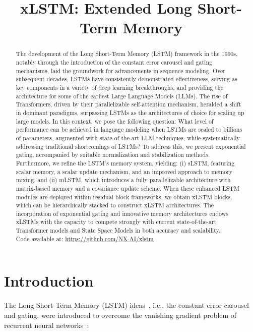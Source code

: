 \title{xLSTM: Extended Long Short-Term Memory}

\begin{abstract}
The development of the Long Short-Term Memory (LSTM) framework in the 1990s, notably through the introduction of the constant error carousel and gating mechanisms, laid the groundwork for advancements in sequence modeling. Over subsequent decades, LSTMs have consistently demonstrated effectiveness, serving as key components in a variety of deep learning breakthroughs, and providing the architecture for some of the earliest Large Language Models (LLMs). The rise of Transformers, driven by their parallelizable self-attention mechanism, heralded a shift in dominant paradigms, surpassing LSTMs as the architectures of choice for scaling up large models. In this context, we pose the following question: What level of performance can be achieved in language modeling when LSTMs are scaled to billions of parameters, augmented with state-of-the-art LLM techniques, while systematically addressing traditional shortcomings of LSTMs? To address this, we present exponential gating, accompanied by suitable normalization and stabilization methods. Furthermore, we refine the LSTM’s memory system, yielding: (i) sLSTM, featuring scalar memory, a scalar update mechanism, and an improved approach to memory mixing, and (ii) mLSTM, which introduces a fully parallelizable architecture with matrix-based memory and a covariance update scheme. When these enhanced LSTM modules are deployed within residual block frameworks, we obtain xLSTM blocks, which can be hierarchically stacked to construct xLSTM architectures. The incorporation of exponential gating and innovative memory architectures endows xLSTMs with the capacity to compete strongly with current state-of-the-art Transformer models and State Space Models in both accuracy and scalability.\\
Code available at: \url{https://github.com/NX-AI/xlstm}
\end{abstract}

\section{Introduction}
\label{sec:intro}

The Long Short-Term Memory (LSTM) ideas~\citep{Hochreiter:91,Hochreiter:97nips,Hochreiter:97}, i.e., the constant error carousel and gating, were introduced to overcome the vanishing gradient problem of recurrent neural networks~\citep{Hochreiter:91,Hochreiter:00book}:


